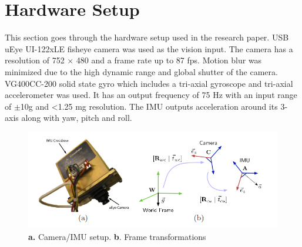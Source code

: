 \section{Hardware Setup}
\label{hardware_setup}

This section goes through the hardware setup used in the research paper. USB uEye UI-122xLE fisheye camera was used as the vision input. The camera has a resolution of 752 × 480 and a frame rate up to 87 fps. Motion blur was minimized due to the high dynamic range and global shutter of the camera. VG400CC-200 solid state gyro which includes a tri-axial gyroscope and tri-axial accelerometer was used. It has an output frequency of 75 Hz with an input range of $\pm$10g and <1.25 mg resolution. The IMU outputs acceleration around its 3-axis along with yaw, pitch and roll.

\begin{figure}
  \includegraphics[width=\textwidth]{./figures/imucam.png}
\caption{\textbf{a.} Camera/IMU setup. \textbf{b}. Frame transformations}
\label{fig:setup1}       %
\end{figure}